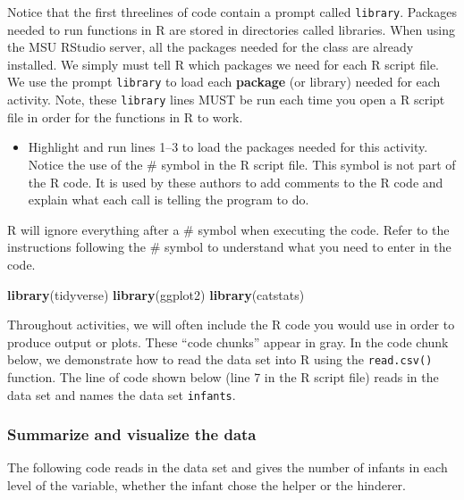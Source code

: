 \documentclass[
]{report}
\newenvironment{Shaded}{\begin{snugshade}}{\end{snugshade}}
\newcommand{\FunctionTok}[1]{\textcolor[rgb]{0.13,0.29,0.53}{\textbf{#1}}}
\newcommand{\NormalTok}[1]{#1}
\providecommand{\tightlist}{%
  \setlength{\itemsep}{0pt}\setlength{\parskip}{0pt}}
\begin{document}
Notice that the first threelines of code contain a prompt called \texttt{library}. Packages needed to run functions in R are stored in directories called libraries. When using the MSU RStudio server, all the packages needed for the class are already installed. We simply must tell R which packages we need for each R script file. We use the prompt \texttt{library} to load each \textbf{package} (or library) needed for each activity. Note, these \texttt{library} lines MUST be run each time you open a R script file in order for the functions in R to work.

\begin{itemize}
\tightlist
\item
  Highlight and run lines 1--3 to load the packages needed for this activity. Notice the use of the \# symbol in the R script file. This symbol is not part of the R code. It is used by these authors to add comments to the R code and explain what each call is telling the program to do.
\end{itemize}

R will ignore everything after a \# symbol when executing the code. Refer to the instructions following the \# symbol to understand what you need to enter in the code.

\begin{Shaded}
\begin{Highlighting}[]
\FunctionTok{library}\NormalTok{(tidyverse)}
\FunctionTok{library}\NormalTok{(ggplot2)}
\FunctionTok{library}\NormalTok{(catstats)}
\end{Highlighting}
\end{Shaded}

Throughout activities, we will often include the R code you would use in order to produce output or plots. These ``code chunks'' appear in gray. In the code chunk below, we demonstrate how to read the data set into R using the \texttt{read.csv()} function. The line of code shown below (line 7 in the R script file) reads in the data set and names the data set \texttt{infants}.

\subsubsection*{Summarize and visualize the data}\label{summarize-and-visualize-the-data}

The following code reads in the data set and gives the number of infants in each level of the variable, whether the infant chose the helper or the hinderer.
\end{document}
